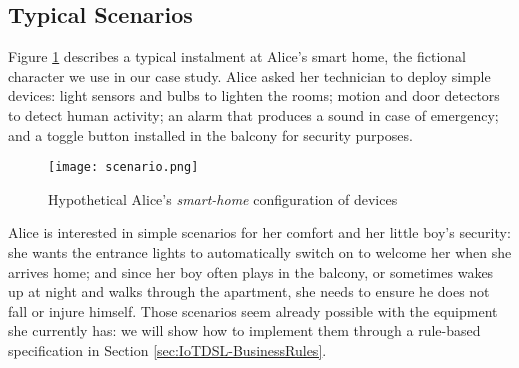 \subsection{Typical \IOT Scenarios}
\label{sec:Motivation-Scenarios}

Figure \ref{fig:scenario} describes a typical instalment at Alice's smart home, the fictional character we use in our case study. Alice asked her technician to deploy simple devices: light sensors and bulbs to lighten the rooms; motion and door detectors to detect human activity; an alarm that produces a sound in case of emergency; and a toggle button installed in the balcony for security purposes. 

\begin{figure}%
	\centering  
	\texttt{[image: scenario.png]}%
	\caption{Hypothetical Alice's \textit{smart-home} configuration of \IOT devices}%
	\label{fig:scenario}%
\end{figure}

Alice is interested in simple scenarios for her comfort and her little boy's security: she wants the entrance lights to automatically switch on to welcome her when she arrives home; 
and since her boy often plays in the balcony, or sometimes wakes up at night and walks through the apartment, she needs to ensure he does not fall or injure himself.
Those scenarios seem already possible with the equipment she currently has: we will show how to implement them through a rule-based specification in Section \ref{sec:IoTDSL-BusinessRules}.


